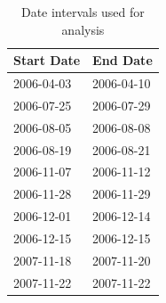 \documentclass[draft,linenumbers]{agujournal2018}
\begin{document}
\begin{table}[h]
  \caption{Date intervals used for analysis}
  \centering
  \begin{tabular}{l l}
    \hline
    Start Date & End Date\\
    \hline
    2006-04-03 & 2006-04-10\\
    2006-07-25 & 2006-07-29\\
    2006-08-05 & 2006-08-08\\
    2006-08-19 & 2006-08-21\\
    2006-11-07 & 2006-11-12\\
    2006-11-28 & 2006-11-29\\
    2006-12-01 & 2006-12-14\\
    2006-12-15 & 2006-12-15\\
    2007-11-18 & 2007-11-20\\
    2007-11-22 & 2007-11-22\\
    \hline
  \end{tabular}
  \label{intervals}
\end{table}
\end{document}
